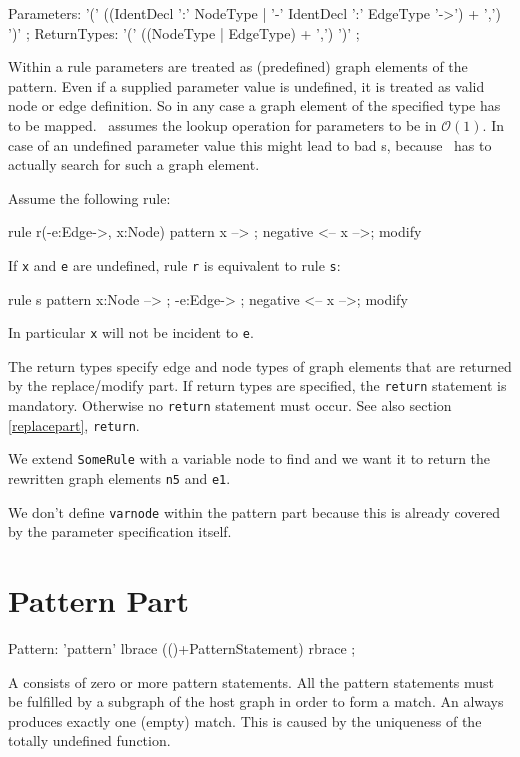 \begin{rail}
  Parameters: '(' ((IdentDecl ':' NodeType | '-' IdentDecl ':' EdgeType '->') + ',') ')' ;
  ReturnTypes: '(' ((NodeType | EdgeType) + ',') ')' ;
\end{rail}
Within a rule parameters are treated as (predefined) graph elements of the pattern. Even if a supplied parameter value is undefined, it is treated as valid node or edge definition. So in any case a graph element of the specified type has to be mapped. \GrG\ assumes the lookup operation for parameters to be in $\mathcal{O}(1)$. In case of an undefined parameter value this might lead to bad s, because \GrG\ has to actually search for such a graph element.
\begin{example}
Assume the following rule:
\begin{grgen}
rule r(-e:Edge->, x:Node) {
  pattern {
    x --> ;
    negative {
      <-- x -->;
    }
  }
  modify {}
}
\end{grgen}
If \texttt{x} and \texttt{e} are undefined, rule \texttt{r} is equivalent to rule \texttt{s}:
\begin{grgen}
rule s {
  pattern {
    x:Node --> ;
    -e:Edge-> ;
    negative {
      <-- x -->;
    }
  }
  modify {}
}
\end{grgen}
In particular \texttt{x} will not be incident to \texttt{e}.
\end{example}
The return types specify edge and node types of graph elements that are returned by the replace/modify part. If return types are specified, the \texttt{return} statement is mandatory. Otherwise no \texttt{return} statement must occur. See also section \ref{replacepart}, \texttt{return}.
\begin{example}
We extend \texttt{SomeRule} with a variable node to find and we want it to return the rewritten graph elements \texttt{n5} and \texttt{e1}.
\begin{grgen}
  rule SomeRuleExt(varnode: Node): (Node, EdgeTypeB) {
    pattern {
      n1: NodeTypeA;
      ...
    }
    replace {
      varnode;
      ...  
      return(n5, e1);
      eval {
        ...
\end{grgen}
We don't define \texttt{varnode} within the pattern part because this is already covered by the parameter specification itself.
\end{example}

\section{Pattern Part}
\label{patternpart}
\begin{rail}
  Pattern: 'pattern' lbrace (()+PatternStatement) rbrace ;
\end{rail}
A  consists of zero or more pattern statements. 
All the pattern statements must be fulfilled by a subgraph of the host graph in order to form a match. 
An  always produces exactly one (empty) match. 
This is caused by the uniqueness of the totally undefined function.


